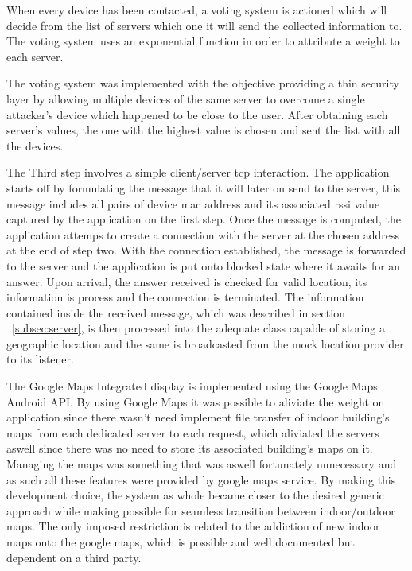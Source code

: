 \documentclass[a4paper]{IEEEtran}
\begin{document}
When every device has been contacted, a voting system is actioned which will decide from the list of servers which one it will send the collected information to. The voting system uses an exponential function in order to attribute a weight to each server. 


The voting system was implemented with the objective providing a thin security layer by allowing multiple devices of the same server to overcome a single attacker's device which happened to be close to the user. After obtaining each server's values, the one with the highest value is chosen and sent the list with all the devices. 

The Third step involves a simple client/server tcp interaction. The application starts off by formulating the message that it will later on send to the server, this message includes all pairs of device mac address and its associated rssi value captured by the application on the first step. Once the message is computed, the application attemps to create a connection with the server at the chosen address at the end of step two. With the connection established, the message is forwarded to the server and the application is put onto blocked state where it awaits for an answer. Upon arrival, the answer received is checked for valid location, its information is process and the connection is terminated. The information contained inside the received message, which was described in section ~\ref{subsec:server}, is then processed into the adequate class capable of storing a geographic location and the same is broadcasted from the mock location provider to its listener. 


The Google Maps Integrated display is implemented using the Google Maps Android API. By using Google Maps it was possible to aliviate the weight on application since there wasn't need implement file transfer of indoor building's maps from each dedicated server to each request, which aliviated the servers aswell since there was no need to store its associated building's maps on it. Managing the maps was something that was aswell fortunately unnecessary and as such all these features were provided by google maps service. By making this development choice, the system as whole became closer to the desired generic approach while making possible for seamless transition between indoor/outdoor maps. The only imposed restriction is related to the addiction of new indoor maps onto the google maps, which is possible and well documented but dependent on a third party.
\end{document}
